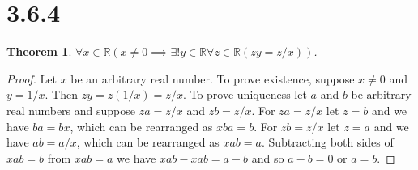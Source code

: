 \documentclass{article}
\newtheorem*{theorem}{Theorem}  %
\begin{document}
\section*{3.6.4}
\begin{theorem} $\forall x \in \mathbb{R} ( x \neq 0 \implies \exists! y \in \mathbb{R} \forall z \in \mathbb{R} (zy = z/x))$.
\end{theorem}

\begin{proof}
Let $x$ be an arbitrary real number. To prove existence, suppose $x \neq 0$ and $y = 1/x$. Then $zy = z(1/x) = z/x$. To prove uniqueness let $a$ and $b$ be arbitrary real numbers and suppose $za = z/x$ and $zb = z/x$. For $za = z/x$ let $z = b$ and we have $ba = bx$, which can be rearranged as $xba = b$. For $zb = z/x$ let $z = a$ and we have $ab = a/x$, which can be rearranged as $xab = a$. Subtracting both sides of $xab = b$ from $xab = a$ we have $xab - xab = a - b$ and so $a - b = 0$ or $a = b$.
\end{proof}
\end{document}
